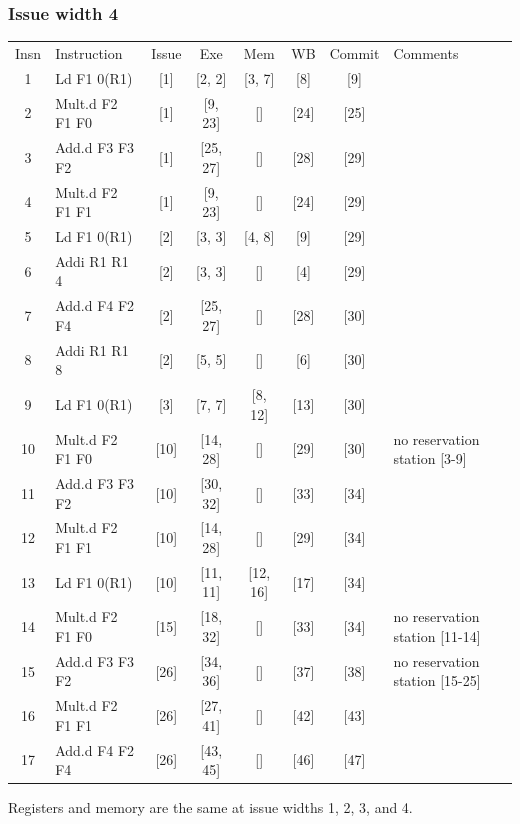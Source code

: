 \documentclass[11pt]{article}
\begin{document}
\subsubsection*{Issue width 4}
\begin{center}
\scriptsize
\setlength{\tabcolsep}{8pt}
\renewcommand{\arraystretch}{1.35}
\begin{tabular}{clccccc>{\raggedright\arraybackslash}p{1.4in}}
Insn & Instruction & Issue & Exe & Mem & WB & Commit & Comments \\
1 & Ld F1 0(R1) & [1] & [2, 2] & [3, 7] & [8] & [9] &  \\
2 & Mult.d F2 F1 F0 & [1] & [9, 23] & [] & [24] & [25] &  \\
3 & Add.d F3 F3 F2 & [1] & [25, 27] & [] & [28] & [29] &  \\
4 & Mult.d F2 F1 F1 & [1] & [9, 23] & [] & [24] & [29] &  \\
5 & Ld F1 0(R1) & [2] & [3, 3] & [4, 8] & [9] & [29] &  \\
6 & Addi R1 R1 4 & [2] & [3, 3] & [] & [4] & [29] &  \\
7 & Add.d F4 F2 F4 & [2] & [25, 27] & [] & [28] & [30] &  \\
8 & Addi R1 R1 8 & [2] & [5, 5] & [] & [6] & [30] &  \\
9 & Ld F1 0(R1) & [3] & [7, 7] & [8, 12] & [13] & [30] &  \\
10 & Mult.d F2 F1 F0 & [10] & [14, 28] & [] & [29] & [30] & no reservation station [3-9] \\
11 & Add.d F3 F3 F2 & [10] & [30, 32] & [] & [33] & [34] &  \\
12 & Mult.d F2 F1 F1 & [10] & [14, 28] & [] & [29] & [34] &  \\
13 & Ld F1 0(R1) & [10] & [11, 11] & [12, 16] & [17] & [34] &  \\
14 & Mult.d F2 F1 F0 & [15] & [18, 32] & [] & [33] & [34] & no reservation station [11-14] \\
15 & Add.d F3 F3 F2 & [26] & [34, 36] & [] & [37] & [38] & no reservation station [15-25] \\
16 & Mult.d F2 F1 F1 & [26] & [27, 41] & [] & [42] & [43] &  \\
17 & Add.d F4 F2 F4 & [26] & [43, 45] & [] & [46] & [47] &  \\
\end{tabular}
\end{center}
Registers and memory are the same at issue widths 1, 2, 3, and 4.
\end{document}
